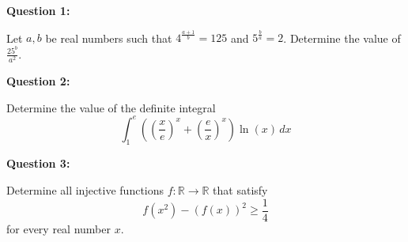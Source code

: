\documentclass{article}
\begin{document}
	
	\noindent \textbf{Question 1:} 
	
	\noindent
	Let \( a, b \) be real numbers such that \( 4^{\frac{a+1}{b}} = 125 \) and \( 5^{\frac{b}{a}} = 2 \). Determine the value of \( \frac{25^b}{a^2} \).
	
	\vspace{1em}
	
	\noindent \textbf{Question 2:} 
	
	\noindent
	Determine the value of the definite integral 
	\[ \int_{1}^{e} \left( \left(\frac{x}{e}\right)^x + \left(\frac{e}{x}\right)^x \right) \ln(x) \, dx \]
	
	\vspace{1em}
	
	\noindent \textbf{Question 3:} 
	
	\noindent
	Determine all injective functions \( f: \mathbb{R} \to \mathbb{R} \) that satisfy 
	\[ f(x^2) - (f(x))^2 \geq \frac{1}{4} \]
	for every real number \( x \).
	
\end{document}
